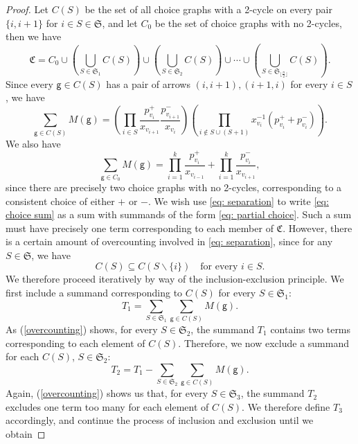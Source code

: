 \documentclass[10pt]{amsart}
\numberwithin{equation}{section}
\theoremstyle{definition}
\theoremstyle{remark}
\newcommand{\1}{^{-1}}
\begin{document}
\begin{proof}
Let $C(S)$ be the set of all choice graphs with a 2-cycle on every pair $\{i,i+1\}$ for $i \in S \in \mathfrak S$, and let $C_0$ be the set of choice graphs with no 2-cycles, then we have
\begin{equation}\label{eq: separation}
\mathfrak C = C_0 \cup \left(\bigcup_{S \in \mathfrak S_1}C(S)\right) \cup \left(\bigcup_{S \in \mathfrak S_2}C(S)\right) \cup \cdots \cup \left(\bigcup_{S \in \mathfrak S_{\lfloor \frac n2 \rfloor}} C(S)\right).
\end{equation}
Since every $\mathsf g \in C(S)$ has a pair of arrows $(i,i+1), (i+1,i)$ for every $i \in S$, we have
\begin{equation}\label{eq: partial choice}
\sum_{\mathsf g \in C(S)} M(\mathsf g) = \left(\prod_{i\in S} \frac{p_{v_i}^+}{x_{v_{i+1}}}\frac{p_{v_{i+1}}^-}{x_{v_i}}\right) \left(\prod_{i \notin S \cup (S+1)} x_{v_i}\1\left(p_{v_i}^+ + p_{v_i}^-\right)\right).
\end{equation}
We also have 
\[
\sum_{\mathsf g \in C_0} M(\mathsf g) = \prod_{i=1}^k \frac{p_{v_i}^+}{x_{v_{i-1}}} + \prod_{i=1}^k \frac{p_{v_i}^-}{x_{v_{i+1}}},
\]
since there are precisely two choice graphs with no 2-cycles, corresponding to a consistent choice of either $+$ or $-$.
We wish use \eqref{eq: separation} to write \eqref{eq: choice sum} as a sum with summands of the form \eqref{eq: partial choice}. Such a sum must have precisely one term corresponding to each member of $\mathfrak C$. However, there is a certain amount of overcounting involved in \eqref{eq: separation}, since for any $S \in \mathfrak S$, we have
\begin{equation}\label{overcounting}
C(S) \subseteq C(S \smallsetminus \{i\}) \quad \text{for every } i \in S.
\end{equation}
We therefore proceed iteratively by way of the inclusion-exclusion principle. We first include a summand corresponding to $C(S)$ for every $S \in \mathfrak S_1$:
\[
T_1 = \sum_{S \in \mathfrak S_1} \sum_{\mathsf g \in C(S)} M(\mathsf g).
\]
As (\ref{overcounting}) shows, for every $S \in \mathfrak S_2$, the summand $T_1$ contains two terms corresponding to each element of $C(S)$. Therefore, we now exclude a summand for each $C(S)$, $S \in \mathfrak S_2$:
\[
T_2 = T_1 - \sum_{S \in \mathfrak S_2} \sum_{\mathsf g \in C(S)} M(\mathsf g).
\]
Again, (\ref{overcounting}) shows us that, for every $S \in \mathfrak S_3$, the summand $T_2$ excludes one term too many for each element of $C(S)$. We therefore define $T_3$ accordingly, and continue the process of inclusion and exclusion until we obtain

\end{proof}
\end{document}
